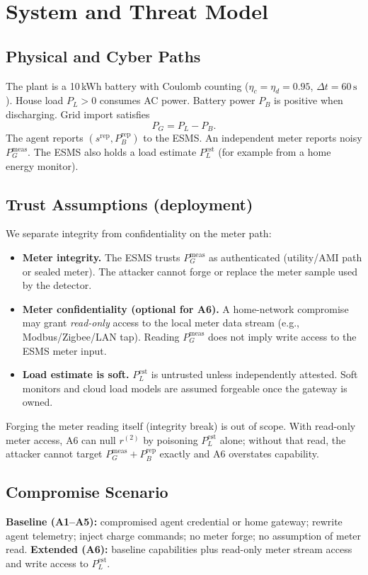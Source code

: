 \documentclass[conference]{IEEEtran}
\begin{document}
\section{System and Threat Model}
\subsection{Physical and Cyber Paths}
The plant is a 10\,kWh battery with Coulomb counting ($\eta_c=\eta_d=0.95$, $\Delta t=60\,\mathrm{s}$). House load $P_L>0$ consumes AC power. Battery power $P_B$ is positive when discharging. Grid import satisfies
\begin{equation}
P_G = P_L - P_B.
\end{equation}
The agent reports $(s^{\mathrm{rep}}, P_B^{\mathrm{rep}})$ to the ESMS. An independent meter reports noisy $P_G^{\mathrm{meas}}$. The ESMS also holds a load estimate $P_L^{\mathrm{est}}$ (for example from a home energy monitor).

\subsection{Trust Assumptions (deployment)}
We separate integrity from confidentiality on the meter path:
\begin{itemize}
\item \textbf{Meter integrity.} The ESMS trusts $P_G^{\mathrm{meas}}$ as authenticated (utility/AMI path or sealed meter). The attacker cannot forge or replace the meter sample used by the detector.
\item \textbf{Meter confidentiality (optional for A6).} A home-network compromise may grant \emph{read-only} access to the local meter data stream (e.g., Modbus/Zigbee/LAN tap). Reading $P_G^{\mathrm{meas}}$ does not imply write access to the ESMS meter input.
\item \textbf{Load estimate is soft.} $P_L^{\mathrm{est}}$ is untrusted unless independently attested. Soft monitors and cloud load models are assumed forgeable once the gateway is owned.
\end{itemize}
Forging the meter reading itself (integrity break) is out of scope. With read-only meter access, A6 can null $r^{(2)}$ by poisoning $P_L^{\mathrm{est}}$ alone; without that read, the attacker cannot target $P_G^{\mathrm{meas}}+P_B^{\mathrm{rep}}$ exactly and A6 overstates capability.

\subsection{Compromise Scenario}
\textbf{Baseline (A1--A5):} compromised agent credential or home gateway; rewrite agent telemetry; inject charge commands; no meter forge; no assumption of meter read.
\textbf{Extended (A6):} baseline capabilities plus read-only meter stream access and write access to $P_L^{\mathrm{est}}$.
\end{document}
